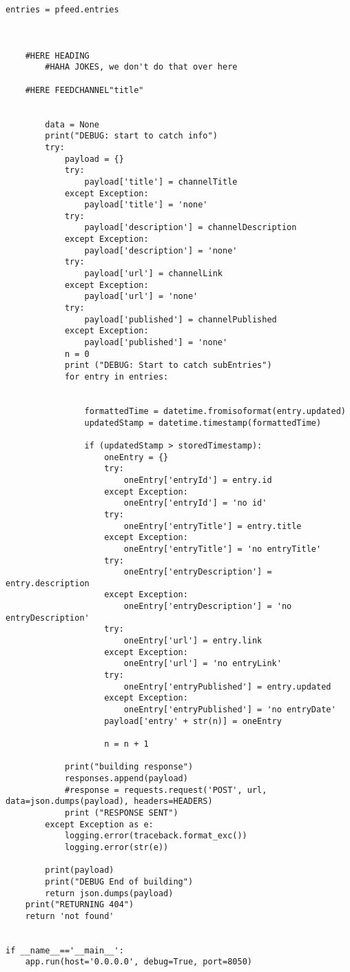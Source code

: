 \begin{lstlisting}[style=jorge-python]
        entries = pfeed.entries



    #HERE HEADING
        #HAHA JOKES, we don't do that over here

    #HERE FEEDCHANNEL"title"


        data = None
        print("DEBUG: start to catch info")
        try:
            payload = {}
            try:
                payload['title'] = channelTitle
            except Exception:
                payload['title'] = 'none'
            try:
                payload['description'] = channelDescription
            except Exception:
                payload['description'] = 'none'
            try:
                payload['url'] = channelLink
            except Exception:
                payload['url'] = 'none'
            try:
                payload['published'] = channelPublished
            except Exception:
                payload['published'] = 'none'
            n = 0
            print ("DEBUG: Start to catch subEntries")
            for entry in entries:


                formattedTime = datetime.fromisoformat(entry.updated)
                updatedStamp = datetime.timestamp(formattedTime)

                if (updatedStamp > storedTimestamp):
                    oneEntry = {}
                    try:
                        oneEntry['entryId'] = entry.id
                    except Exception:
                        oneEntry['entryId'] = 'no id'
                    try:
                        oneEntry['entryTitle'] = entry.title
                    except Exception:
                        oneEntry['entryTitle'] = 'no entryTitle'
                    try:
                        oneEntry['entryDescription'] = entry.description
                    except Exception:
                        oneEntry['entryDescription'] = 'no entryDescription'
                    try:
                        oneEntry['url'] = entry.link
                    except Exception:
                        oneEntry['url'] = 'no entryLink'
                    try:
                        oneEntry['entryPublished'] = entry.updated
                    except Exception:
                        oneEntry['entryPublished'] = 'no entryDate'
                    payload['entry' + str(n)] = oneEntry

                    n = n + 1

            print("building response")
            responses.append(payload)
            #response = requests.request('POST', url, data=json.dumps(payload), headers=HEADERS)
            print ("RESPONSE SENT")
        except Exception as e:
            logging.error(traceback.format_exc())
            logging.error(str(e))

        print(payload)
        print("DEBUG End of building")
        return json.dumps(payload)
    print("RETURNING 404")
    return 'not found'


if __name__=='__main__':
    app.run(host='0.0.0.0', debug=True, port=8050)
\end{lstlisting}

